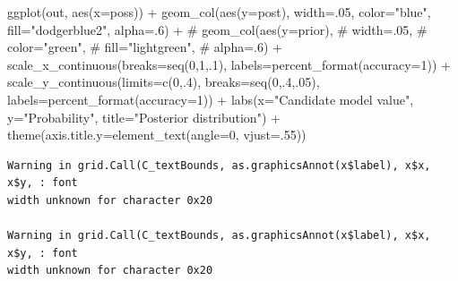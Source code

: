 \documentclass[
  letterpaper,
  DIV=11,
  numbers=noendperiod,
  oneside]{scrartcl}
\newenvironment{Shaded}{\begin{snugshade}}{\end{snugshade}}
\newcommand{\AttributeTok}[1]{\textcolor[rgb]{0.40,0.45,0.13}{#1}}
\newcommand{\CommentTok}[1]{\textcolor[rgb]{0.37,0.37,0.37}{#1}}
\newcommand{\DecValTok}[1]{\textcolor[rgb]{0.68,0.00,0.00}{#1}}
\newcommand{\FunctionTok}[1]{\textcolor[rgb]{0.28,0.35,0.67}{#1}}
\newcommand{\NormalTok}[1]{\textcolor[rgb]{0.00,0.23,0.31}{#1}}
\newcommand{\SpecialCharTok}[1]{\textcolor[rgb]{0.37,0.37,0.37}{#1}}
\newcommand{\StringTok}[1]{\textcolor[rgb]{0.13,0.47,0.30}{#1}}
\begin{document}
\begin{enumerate}
\begin{Shaded}
\begin{Highlighting}[]
\FunctionTok{ggplot}\NormalTok{(out, }\FunctionTok{aes}\NormalTok{(}\AttributeTok{x=}\NormalTok{poss)) }\SpecialCharTok{+} 
  \FunctionTok{geom\_col}\NormalTok{(}\FunctionTok{aes}\NormalTok{(}\AttributeTok{y=}\NormalTok{post),}
           \AttributeTok{width=}\NormalTok{.}\DecValTok{05}\NormalTok{,}
           \AttributeTok{color=}\StringTok{"blue"}\NormalTok{,}
           \AttributeTok{fill=}\StringTok{"dodgerblue2"}\NormalTok{,}
           \AttributeTok{alpha=}\NormalTok{.}\DecValTok{6}\NormalTok{) }\SpecialCharTok{+} 
  \CommentTok{\# geom\_col(aes(y=prior),}
  \CommentTok{\#          width=.05,}
  \CommentTok{\#          color="green",}
  \CommentTok{\#          fill="lightgreen",}
  \CommentTok{\#          alpha=.6) + }
  \FunctionTok{scale\_x\_continuous}\NormalTok{(}\AttributeTok{breaks=}\FunctionTok{seq}\NormalTok{(}\DecValTok{0}\NormalTok{,}\DecValTok{1}\NormalTok{,.}\DecValTok{1}\NormalTok{),}
                     \AttributeTok{labels=}\FunctionTok{percent\_format}\NormalTok{(}\AttributeTok{accuracy=}\DecValTok{1}\NormalTok{)) }\SpecialCharTok{+} 
  \FunctionTok{scale\_y\_continuous}\NormalTok{(}\AttributeTok{limits=}\FunctionTok{c}\NormalTok{(}\DecValTok{0}\NormalTok{,.}\DecValTok{4}\NormalTok{),}
                     \AttributeTok{breaks=}\FunctionTok{seq}\NormalTok{(}\DecValTok{0}\NormalTok{,.}\DecValTok{4}\NormalTok{,.}\DecValTok{05}\NormalTok{),}
                     \AttributeTok{labels=}\FunctionTok{percent\_format}\NormalTok{(}\AttributeTok{accuracy=}\DecValTok{1}\NormalTok{)) }\SpecialCharTok{+}
  \FunctionTok{labs}\NormalTok{(}\AttributeTok{x=}\StringTok{"Candidate model value"}\NormalTok{,}
       \AttributeTok{y=}\StringTok{"Probability"}\NormalTok{,}
       \AttributeTok{title=}\StringTok{"Posterior distribution"}\NormalTok{) }\SpecialCharTok{+}
  \FunctionTok{theme}\NormalTok{(}\AttributeTok{axis.title.y=}\FunctionTok{element\_text}\NormalTok{(}\AttributeTok{angle=}\DecValTok{0}\NormalTok{, }\AttributeTok{vjust=}\NormalTok{.}\DecValTok{55}\NormalTok{))}
\end{Highlighting}
\end{Shaded}

\begin{verbatim}
Warning in grid.Call(C_textBounds, as.graphicsAnnot(x$label), x$x, x$y, : font
width unknown for character 0x20

Warning in grid.Call(C_textBounds, as.graphicsAnnot(x$label), x$x, x$y, : font
width unknown for character 0x20


\end{verbatim}
\end{enumerate}
\end{document}
